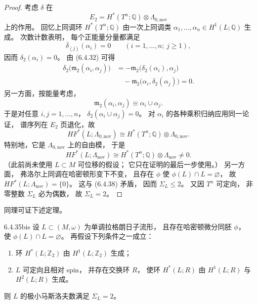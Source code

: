 \begin{proof}
考虑 $\delta$ 在
\[
E_2=H^*(T^n;\mathbb Q)
\otimes\Lambda_{0,\mathrm{nov}}
\]
上的作用。
回忆上同调环 $H^*(T^n;\mathbb Q)$
由一次上同调类
$\alpha_1,\ldots,\alpha_n
\in H^1(L;\mathbb Q)$ 生成。
次数计数表明，
每个正能量分量都满足
\[
\overline\delta_{(j)}(\alpha_i)=0
\qquad(i=1,\ldots,n;\ j\ge1),
\]
因而 $\delta_2(\alpha_i)=0$。
由 (6.4.32) 可得
\begin{equation}
\begin{aligned}
\delta_2\bigl(\mathfrak m_2(\alpha_i,\alpha_j)\bigr)
&=-\mathfrak m_2\bigl(\delta_2(\alpha_i),\alpha_j\bigr)\\
&\quad-\mathfrak m_2\bigl(\alpha_i,\delta_2(\alpha_j)\bigr)=0.
\end{aligned}
\tag{6.4.37}\label{eq:6-4-37}
\end{equation}
另一方面，按能量考虑，
\[
\mathfrak m_2(\alpha_i,\alpha_j)
\equiv\alpha_i\cup\alpha_j.
\]
于是对任意 $i,j=1,\ldots,n$，
$\delta_2(\alpha_i\cup\alpha_j)=0$。
对 $\alpha_i$ 的各种乘积归纳应用同一论证，
谱序列在 $E_2$ 页退化，故
\[
HF^*(L;\Lambda_{0,\mathrm{nov}})
\cong H^*(T^n;\mathbb Q)
\otimes\Lambda_{0,\mathrm{nov}}.
\]
特别地，它是
$\Lambda_{0,\mathrm{nov}}$ 上的自由模，
于是
\begin{equation}
HF^*(L;\Lambda_{\mathrm{nov}})
\cong H^*(T^n;\mathbb Q)
\otimes\Lambda_{\mathrm{nov}}\ne0.
\tag{6.4.38}\label{eq:6-4-38}
\end{equation}
（此前尚未使用 $L\subset M$ 可位移的假设；
它只在证明的最后一步使用。）
另一方面，
弗洛尔上同调在哈密顿形变下不变，
且存在 $\phi$ 使
$\phi(L)\cap L=\varnothing$，
故
$HF^*(L;\Lambda_{\mathrm{nov}})=\{0\}$。
这与 (6.4.38) 矛盾，
因而 $\Sigma_L\le2$。
又因 $T^n$ 可定向，
非零整数 $\Sigma_L$ 必为偶数，
故 $\Sigma_L=2$。
\end{proof}

\pagebreak
同理可证下述定理。

\begin{theorem}{6.4.35bis}\label{thm:6-4-35bis}
设 $L\subset(M,\omega)$
为单调拉格朗日子流形，
且存在哈密顿微分同胚 $\phi$，
使 $\phi(L)\cap L=\varnothing$。
再假设下列条件之一成立：
\begin{enumerate}
\item[(1)] 环 $H^*(L;\mathbb Z_2)$
由 $H^1(L;\mathbb Z_2)$ 生成；
\item[(2)] $L$ 可定向且相对 spin，
并存在交换环 $R$，
使环 $H^*(L;R)$
由 $H^1(L;R)$ 与 $H^2(L;R)$ 生成。
\end{enumerate}
则 $L$ 的极小马斯洛夫数满足
$\Sigma_L=2$。
\end{theorem}

